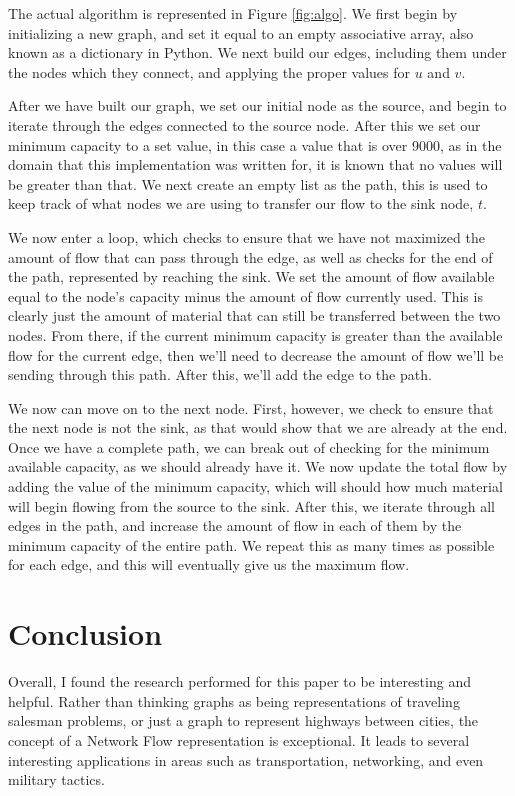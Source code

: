 \documentclass[conference]{IEEEtran}
\begin{document}
The actual algorithm is represented in Figure \ref{fig:algo}. We first begin by initializing a new graph, and set it equal to an empty associative array, also known as a dictionary in Python. We next build our edges, including them under the nodes which they connect, and applying the proper values for $u$ and $v$. 

After we have built our graph, we set our initial node as the source, and begin to iterate through the edges connected to the source node. After this we set our minimum capacity to a set value, in this case a value that is over 9000, as in the domain that this implementation was written for, it is known that no values will be greater than that. We next create an empty list as the path, this is used to keep track of what nodes we are using to transfer our flow to the sink node, $t$.

We now enter a loop, which checks to ensure that we have not maximized the amount of flow that can pass through the edge, as well as checks for the end of the path, represented by reaching the sink. We set the amount of flow available equal to the node's capacity minus the amount of flow currently used. This is clearly just the amount of material that can still be transferred between the two nodes. From there, if the current minimum capacity is greater than the available flow for the current edge, then we'll need to decrease the amount of flow we'll be sending through this path. After this, we'll add the edge to the path. 

We now can move on to the next node. First, however, we check to ensure that the next node is not the sink, as that would show that we are already at the end. Once we have a complete path, we can break out of checking for the minimum available capacity, as we should already have it. We now update the total flow by adding the value of the minimum capacity, which will should how much material will begin flowing from the source to the sink. After this, we iterate through all edges in the path, and increase the amount of flow in each of them by the minimum capacity of the entire path. We repeat this as many times as possible for each edge, and this will eventually give us the maximum flow.
\section{Conclusion}
Overall, I found the research performed for this paper to be interesting and helpful. Rather than thinking graphs as being representations of traveling salesman problems, or just a graph to represent highways between cities, the concept of a Network Flow representation is exceptional. It leads to several interesting applications in areas such as transportation, networking, and even military tactics.
\end{document}
